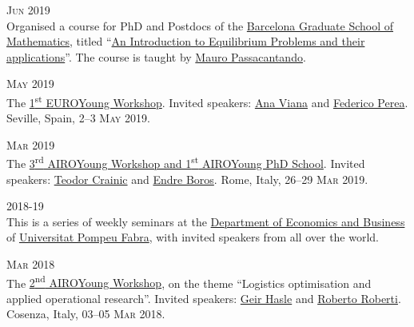 \begin{paracol}{2}
  \textsc{Jun 2019}
\switchcolumn
  \\
  Organised a course for PhD and Postdocs of the \href{https://www.bgsmath.cat/}{Barcelona Graduate School of Mathematics}, titled ``\href{https://web.archive.org/web/20190115064545/https://bgsmath.cat/event/introduction-equilibrium-problems-applications/}{An Introduction to Equilibrium Problems and their applications}''.
  The course is taught by \href{https://scholar.google.com/citations?user=GEtI8UUAAAAJ}{Mauro Passacantando}.
\end{paracol}

\begin{paracol}{2}
  \textsc{May 2019}
\switchcolumn
  \\
  The \href{https://euroyoung.github.io/workshop19.html}{1\textsuperscript{st} EUROYoung Workshop}.
  Invited speakers: \href{https://scholar.google.it/citations?user=RW7QevYAAAAJ}{Ana Viana} and \href{https://scholar.google.com/citations?user=DzigbIgAAAAJ}{Federico Perea}.
  Seville, Spain, \textsc{2--3 May 2019}.
\end{paracol}

\begin{paracol}{2}
  \textsc{Mar 2019}
\switchcolumn
  \\
  The \href{https://workshop.airoyoung.org/2019}{3\textsuperscript{rd} AIROYoung Workshop and 1\textsuperscript{st} AIROYoung PhD School}.
  Invited speakers: \href{https://scholar.google.it/citations?user=C_zcTIAAAAAJ}{Teodor Crainic} and \href{https://scholar.google.it/citations?user=ok_1EXwAAAAJ}{Endre Boros}.
  Rome, Italy, \textsc{26--29 Mar 2019}.
\end{paracol}

\begin{paracol}{2}
  \textsc{2018-19}
\switchcolumn
  \\
  This is a series of weekly seminars at the \href{https://www.upf.edu/web/econ/}{Department of Economics and Business} of \href{https://www.upf.edu/}{Universitat Pompeu Fabra}, with invited speakers from all over the world.
\end{paracol}

\begin{paracol}{2}
  \textsc{Mar 2018}
\switchcolumn
  \\
  The \href{https://workshop.airoyoung.org/2018}{2\textsuperscript{nd} AIROYoung Workshop}, on the theme ``Logistics optimisation and applied operational research''.
  Invited speakers: \href{https://scholar.google.it/citations?user=GXRnRZgAAAAJ}{Geir Hasle} and \href{https://scholar.google.it/citations?user=pNQZmwIAAAAJ}{Roberto Roberti}.
  Cosenza, Italy, \textsc{03--05 Mar 2018}.
\end{paracol}

